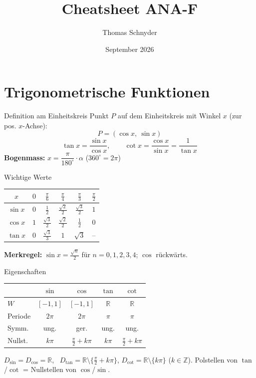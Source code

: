 \documentclass[a4paper, fontsize=7pt]{scrartcl}
\title{Cheatsheet ANA-F}
\author{Thomas Schnyder}
\date{September 2026}
\def\Z{\mathbb{Z}}  %
\def\R{\mathbb{R}}  %
\renewcommand*{\arraystretch}{1.5}  %
\begin{document}
\maketitle

\section{Trigonometrische Funktionen}

\begin{mainbox}{Definition am Einheitskreis}
Punkt $P$ auf dem Einheitskreis mit Winkel $x$ (zur pos. $x$-Achse):
$$P = (\cos x,\ \sin x)$$
$$\tan x = \frac{\sin x}{\cos x}, \qquad \cot x = \frac{\cos x}{\sin x} = \frac{1}{\tan x}$$
\textbf{Bogenmass:} $x = \dfrac{\pi}{180^\circ} \cdot \alpha$ \quad ($360^\circ = 2\pi$)
\end{mainbox}

\begin{mainbox}{Wichtige Werte}
\renewcommand*{\arraystretch}{1.6}
\setlength{\tabcolsep}{4pt}
\begin{center}
\begin{tabular}{c|ccccc}
$x$ & $0$ & $\frac{\pi}{6}$ & $\frac{\pi}{4}$ & $\frac{\pi}{3}$ & $\frac{\pi}{2}$ \\
\hline
$\sin x$ & $0$ & $\frac{1}{2}$ & $\frac{\sqrt2}{2}$ & $\frac{\sqrt3}{2}$ & $1$ \\
$\cos x$ & $1$ & $\frac{\sqrt3}{2}$ & $\frac{\sqrt2}{2}$ & $\frac{1}{2}$ & $0$ \\
$\tan x$ & $0$ & $\frac{\sqrt3}{3}$ & $1$ & $\sqrt3$ & -- \\
\end{tabular}
\end{center}
\textbf{Merkregel:} $\sin x = \frac{\sqrt{n}}{2}$ für $n = 0,1,2,3,4$; $\cos$ rückwärts.
\end{mainbox}

\begin{mainbox}{Eigenschaften}
\renewcommand*{\arraystretch}{1.5}
\setlength{\tabcolsep}{3pt}
\begin{tabular}{l|cccc}
 & $\sin$ & $\cos$ & $\tan$ & $\cot$ \\
\hline
$W$ & $[-1,1]$ & $[-1,1]$ & $\R$ & $\R$ \\
Periode & $2\pi$ & $2\pi$ & $\pi$ & $\pi$ \\
Symm. & ung. & ger. & ung. & ung. \\
Nullst. & $k\pi$ & $\frac{\pi}{2} + k\pi$ & $k\pi$ & $\frac{\pi}{2} + k\pi$ \\
\end{tabular}
$D_{\sin} = D_{\cos} = \R$, \ $D_{\tan} = \R \setminus \{\frac{\pi}{2} + k\pi\}$,
$D_{\cot} = \R \setminus \{k\pi\}$ ($k \in \Z$). Polstellen von $\tan$/$\cot$ = Nullstellen von $\cos$/$\sin$.
\end{mainbox}
\end{document}

